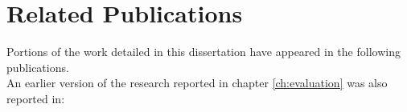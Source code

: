 \chapter*{Related Publications}

Portions of the work detailed in this dissertation have appeared in
the following publications. \\[1ex]

\noindent An earlier version of the research reported in chapter
\ref{ch:evaluation} was also reported in:

 \\[1ex]

